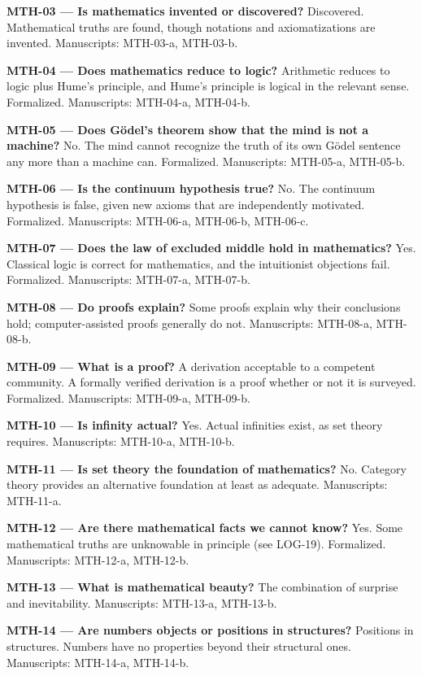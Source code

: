 \documentclass[10pt]{article}
\begin{document}
\textbf{MTH-03 --- Is mathematics invented or discovered?} Discovered. Mathematical truths are found, though notations and axiomatizations are invented. Manuscripts: MTH-03-a, MTH-03-b.

\textbf{MTH-04 --- Does mathematics reduce to logic?} Arithmetic reduces to logic plus Hume's principle, and Hume's principle is logical in the relevant sense. Formalized. Manuscripts: MTH-04-a, MTH-04-b.

\textbf{MTH-05 --- Does Gödel's theorem show that the mind is not a machine?} No. The mind cannot recognize the truth of its own Gödel sentence any more than a machine can. Formalized. Manuscripts: MTH-05-a, MTH-05-b.

\textbf{MTH-06 --- Is the continuum hypothesis true?} No. The continuum hypothesis is false, given new axioms that are independently motivated. Formalized. Manuscripts: MTH-06-a, MTH-06-b, MTH-06-c.

\textbf{MTH-07 --- Does the law of excluded middle hold in mathematics?} Yes. Classical logic is correct for mathematics, and the intuitionist objections fail. Formalized. Manuscripts: MTH-07-a, MTH-07-b.

\textbf{MTH-08 --- Do proofs explain?} Some proofs explain why their conclusions hold; computer-assisted proofs generally do not. Manuscripts: MTH-08-a, MTH-08-b.

\textbf{MTH-09 --- What is a proof?} A derivation acceptable to a competent community. A formally verified derivation is a proof whether or not it is surveyed. Formalized. Manuscripts: MTH-09-a, MTH-09-b.

\textbf{MTH-10 --- Is infinity actual?} Yes. Actual infinities exist, as set theory requires. Manuscripts: MTH-10-a, MTH-10-b.

\textbf{MTH-11 --- Is set theory the foundation of mathematics?} No. Category theory provides an alternative foundation at least as adequate. Manuscripts: MTH-11-a.

\textbf{MTH-12 --- Are there mathematical facts we cannot know?} Yes. Some mathematical truths are unknowable in principle (see LOG-19). Formalized. Manuscripts: MTH-12-a, MTH-12-b.

\textbf{MTH-13 --- What is mathematical beauty?} The combination of surprise and inevitability. Manuscripts: MTH-13-a, MTH-13-b.

\textbf{MTH-14 --- Are numbers objects or positions in structures?} Positions in structures. Numbers have no properties beyond their structural ones. Manuscripts: MTH-14-a, MTH-14-b.
\end{document}

